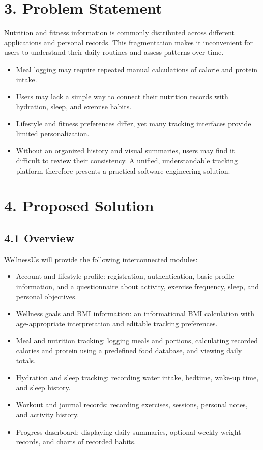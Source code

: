 \documentclass[11pt,a4paper]{article}
\begin{document}
\section*{3. Problem Statement}
Nutrition and fitness information is commonly distributed across different applications and personal records. This fragmentation makes it inconvenient for users to understand their daily routines and assess patterns over time.

\begin{itemize}
\item Meal logging may require repeated manual calculations of calorie and protein intake.
\item Users may lack a simple way to connect their nutrition records with hydration, sleep, and exercise habits.
\item Lifestyle and fitness preferences differ, yet many tracking interfaces provide limited personalization.
\item Without an organized history and visual summaries, users may find it difficult to review their consistency. A unified, understandable tracking platform therefore presents a practical software engineering solution.
\end{itemize}
\section*{4. Proposed Solution}
\subsection*{4.1 Overview}
WellnessUs will provide the following interconnected modules:

\begin{itemize}
\item Account and lifestyle profile: registration, authentication, basic profile information, and a questionnaire about activity, exercise frequency, sleep, and personal objectives.
\item Wellness goals and BMI information: an informational BMI calculation with age-appropriate interpretation and editable tracking preferences.
\item Meal and nutrition tracking: logging meals and portions, calculating recorded calories and protein using a predefined food database, and viewing daily totals.
\item Hydration and sleep tracking: recording water intake, bedtime, wake-up time, and sleep history.
\item Workout and journal records: recording exercises, sessions, personal notes, and activity history.
\item Progress dashboard: displaying daily summaries, optional weekly weight records, and charts of recorded habits.
\end{itemize}
\end{document}
